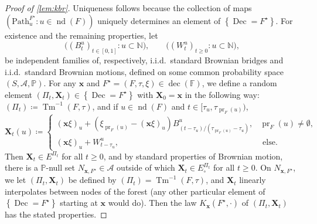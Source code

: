 \documentclass[reqno,draft]{amsart}
\numberwithin{equation}{section}
\theoremstyle{plain}
\theoremstyle{remark}
\newcommand{\N}{\mathbb{N}} %
\newcommand{\A}{\mathcal{A}} %
\renewcommand{\P}{\mathbb{P}} %
\DeclareMathOperator{\pr}{pr}
\newcommand{\fpart}{\Pi} %
\DeclareMathOperator{\nd}{nd}
\DeclareMathOperator{\dcb}{dec}
\newcommand{\kbr}{K} %
\DeclareMathOperator{\tm}{Tm}
\DeclareMathOperator{\dc}{Dec}
\newcommand{\pth}{\mathrm{Path}}
\begin{document}
\begin{proof}[Proof of \cref{lem:kbr}]
    Uniqueness follows because the collection of maps $(\pth^{F^\star}_u\colon u\in \nd(F))$ uniquely determines an element of $\left\{ \dc =F^\star \right\} $.
    For existence and the remaining properties, let \[
        \Big((B_t^u)_{t\in [0,1]}\colon u\subset \N\Big),\qquad \Big( (W_t^u)_{t\ge 0} \colon u\subset \N\Big),
        \] be independent families of, respectively, i.i.d.\ standard Brownian bridges and i.i.d.\ standard Brownian motions, defined on some common probability space $(S,\mathcal{A},\P)$. For any $\boldsymbol x$ and $F^\star = (F,\tau,\xi) \in \dcb(\mathbb{F})$, we define a random element $(\fpart_t,\boldsymbol X_t) \in \left\{ \dc = F^\star \right\} $ with $\boldsymbol X_0 = \boldsymbol x$ in the following way: $(\fpart_t) \coloneqq  \tm^{-1}(F,\tau)$, and if $u\in \nd(F)$ and $t \in [\tau_u,\tau_{\pr_F(u)})$, \[
        \boldsymbol X_t(u) \coloneqq 
        \begin{cases}
            (\boldsymbol x \xi)_u + (\xi_{\pr_F(u)} - (\boldsymbol x\xi)_u) B^u_{(t - \tau_u) / (\tau_{\pr_F(u)} - \tau_u)}, & \pr_F(u) \neq \emptyset ,\\
            (\boldsymbol x \xi)_u + W^u_{t - \tau_u}, & \text{ else}.
        \end{cases}
    \] Then $\boldsymbol X_t \in E^{\fpart_t}$ for all $t \ge 0$, and by standard properties of Brownian motion, there is a $\P$-null set $N_{\boldsymbol x,F^\star}\in \A$ outside of which $\boldsymbol X_t \in E^{\fpart_t}_\circ $ for all $t \ge 0$. On $N_{\boldsymbol x,F^\star}$, we let $(\fpart_t,\boldsymbol X_t)$ be defined by $(\fpart_t) = \tm^{-1}(F,\tau)$, and $\boldsymbol X_t$ linearly interpolates between nodes of the forest (any other particular element of $\left\{ \dc = F^\star \right\} $ starting at $\boldsymbol x$ would do). Then the law $\kbr_{\boldsymbol x}(F^\star,\cdot )$ of $(\fpart_t,\boldsymbol X_t)$ has the stated properties.


\end{proof}
\end{document}
